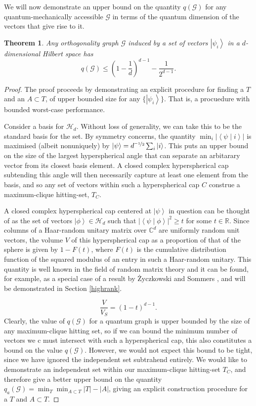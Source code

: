 \documentclass{amsart}
\newtheorem{thm}{Theorem}
\theoremstyle{definition}
\newcommand{\ket}[1]{{\left\vert{#1}\right\rangle}}
\newcommand{\braket}[2]{{\left< {#1} \middle\vert {#2}\right>}}
\newcommand{\sprod}[2]{\left|\left< {#1} \middle| {#2} \right>\right|}
\begin{document}
We will now demonstrate an upper bound on the quantity $q(\mathcal{G})$ for any quantum-mechanically accessible $\mathcal{G}$ in terms of the quantum dimension of the vectors that give rise to it.
\begin{thm}\label{main}
Any orthogonality graph $\mathcal{G}$ induced by a set of vectors $\ket{\psi_i}$ in a $d$-dimensional Hilbert space has
\begin{equation}
q(\mathcal{G}) \leq \left(1-\frac1d\right)^{d-1}-\frac{1}{2^{d-1}}.
\end{equation}
\end{thm}
\begin{proof}
The proof proceeds by demonstrating an explicit procedure for finding a $T$ and an $A\subset T$, of upper bounded size for any $\{\ket{\psi_i}\}$. That is, a procuedure with bounded worst-case performance.

Consider a basis for $\mathcal{H}_d$. Without loss of generality, we can take this to be the standard basis for the set. By symmetry concerns, the quantity $\min_i \left|\braket{\psi}{i}\right|$ is maximised (albeit nonuniquely) by $\ket{\psi}=d^{\nicefrac{-1}{2}}\sum_i\ket{i}$. This puts an upper bound on the size of the largest hyperspherical angle that can separate an arbitarary vector from its closest basis element. A closed complex hyperspherical cap subtending this angle will then necessarily capture at least one element from the basis, and so any set of vectors within such a hyperspherical cap $C$ construe a maximum-clique hitting-set, $T_C$.

A closed complex hyperspherical cap centered at $\ket{\psi}$ in question can be thought of as the set of vectors $\ket{\phi}\in\mathcal{H}_d$ such that $\sprod{\psi}{\phi}^2\geq t$ for some $t\in\mathbb{R}$. Since columns of a Haar-random unitary matrix over $\mathbb{C}^d$ are uniformly random unit vectors, the volume $V$ of this hyperspherical cap as a proportion of that of the sphere is given by $1-F(t)$, where $F(t)$ is the cumulative distribution function of the squared  modulus of an entry in such a Haar-random unitary. This quantity is well known in the field of random matrix theory and it can be found, for example, as a special case of a result by \.{Z}yczkowski and Sommers \cite{Zycz2000}, and will be demonstrated in Section \ref{highrank}.

\begin{equation}
\frac{V}{V_S}=\left(1-t \right)^{d-1}.
\end{equation}
Clearly, the value of $q(\mathcal{G})$ for a quantum graph is upper bounded by the size of any maximum-clique hitting set, so if we can bound the minimum number of vectors we c must intersect with such a hyperspherical cap, this also constitutes a bound on the value $q(\mathcal{G})$. However, we would not expect this bound to be tight, since we have ignored the independent set subtrahend entirely. We would like to demonstrate an independent set within our maximum-clique hitting-set $T_C$, and therefore give a better upper bound on the quantity $q_a(\mathcal{G})=\min_T \min_{A\subset T} |T|-|A|$, giving an explicit construction procedure for a $T$ and $A\subset T$.


\end{proof}
\end{document}
